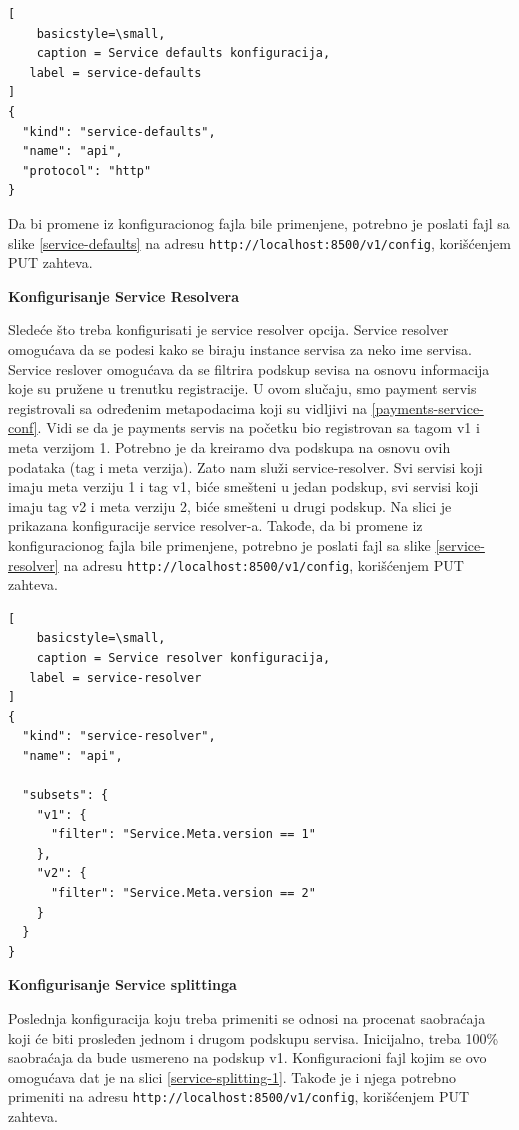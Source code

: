 \documentclass[a4paper,12pt]{report}
\begin{document}
\begin{lstlisting}[
    basicstyle=\small,
    caption = Service defaults konfiguracija, 
   label = service-defaults
]
{
  "kind": "service-defaults",
  "name": "api",
  "protocol": "http"
}
\end{lstlisting}

Da bi promene iz konfiguracionog fajla bile primenjene, potrebno je poslati fajl sa slike  \ref{service-defaults} na adresu \texttt{http://localhost:8500/v1/config}, korišćenjem PUT zahteva. \newline

\textbf{Konfigurisanje Service Resolvera}\newline

Sledeće što treba konfigurisati je service resolver opcija. Service resolver omogućava da se podesi kako se biraju instance servisa za neko ime servisa. Service reslover omogućava da se filtrira podskup sevisa na osnovu informacija koje su pružene u trenutku registracije. U ovom slučaju, smo payment servis registrovali sa određenim metapodacima koji su vidljivi na \ref{payments-service-conf}. Vidi se da je payments servis na početku bio registrovan sa tagom v1 i meta verzijom 1. Potrebno je da kreiramo dva podskupa na osnovu ovih podataka (tag i meta verzija). Zato nam služi service-resolver. Svi servisi koji imaju meta verziju 1 i tag v1, biće smešteni u jedan podskup, svi servisi koji imaju tag v2 i meta verziju 2, biće smešteni u drugi podskup. Na slici je prikazana konfiguracije service resolver-a. Takođe, da bi promene iz konfiguracionog fajla bile primenjene, potrebno je poslati fajl sa slike  \ref{service-resolver} na adresu \texttt{http://localhost:8500/v1/config}, korišćenjem PUT zahteva. \newline

\begin{lstlisting}[
    basicstyle=\small,
    caption = Service resolver konfiguracija, 
   label = service-resolver
]
{
  "kind": "service-resolver",
  "name": "api",

  "subsets": {
    "v1": {
      "filter": "Service.Meta.version == 1"
    },
    "v2": {
      "filter": "Service.Meta.version == 2"
    }
  }
}
\end{lstlisting}

\textbf{Konfigurisanje Service splittinga}\newline

Poslednja konfiguracija koju treba primeniti se odnosi na procenat saobraćaja koji će biti prosleđen jednom i drugom podskupu servisa. Inicijalno, treba 100\% saobraćaja da bude usmereno na podskup v1. Konfiguracioni fajl kojim se ovo omogućava dat je na slici \ref{service-splitting-1}. Takođe je i njega potrebno primeniti na adresu \texttt{http://localhost:8500/v1/config}, korišćenjem PUT zahteva. \newline
\end{document}
